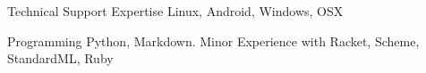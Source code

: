 

\begin{cvskills}

  \cvskill
    {Technical Support Expertise} %
    {Linux, Android, Windows, OSX} %

  \cvskill
    {Programming} %
    {Python, Markdown. Minor Experience with Racket, Scheme, StandardML, Ruby} %

\end{cvskills}

